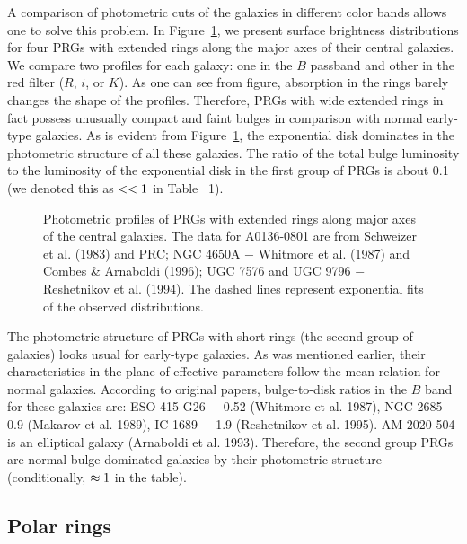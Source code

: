 A comparison of photometric cuts of the galaxies in different
color bands allows one to solve this problem. In Figure~\ref{Fcuts}, 
we present
surface brightness distributions for four PRGs with extended
rings along the major axes of their central galaxies. We compare
two profiles for each galaxy: one in the $B$
passband and other in the red filter ($R$, $i$, or $K$).
As one can see from figure, absorption in the rings barely
changes the shape of the profiles. Therefore, PRGs with wide
extended rings in fact possess unusually compact and faint bulges
in comparison with normal early-type galaxies. As is evident 
from Figure~\ref{Fcuts}, 
the exponential disk dominates in the photometric structure of all these 
galaxies. The ratio of the total bulge luminosity to the luminosity
of the exponential disk in the first group of PRGs is about 0.1 (we
denoted this as $\rm <<1$ in Table~ 1).

\begin{figure}
\picplace{0.8cm}
\caption[1]{Photometric profiles of PRGs with extended rings
along major axes of the central galaxies.
The data for A0136-0801 are from Schweizer et al. (1983) and PRC;
NGC 4650A $-$ Whitmore et al. (1987) and Combes \& Arnaboldi (1996);
UGC 7576 and UGC 9796 $-$ Reshetnikov et al. (1994). The dashed
lines represent exponential fits of the observed distributions.} 
\label{Fcuts}
\end{figure}  

The photometric structure of PRGs with short rings (the second
group of galaxies) looks usual for early-type galaxies. As
was mentioned earlier, their characteristics in the
plane of effective parameters follow the mean relation for
normal galaxies. According to original papers, 
bulge-to-disk ratios in the $B$ band for these galaxies are:
ESO 415-G26 $-$ 0.52 (Whitmore et al. 1987), NGC 2685 $-$ 0.9
(Makarov et al. 1989), IC 1689 $-$ 1.9 (Reshetnikov et al. 1995).
AM 2020-504 is an elliptical galaxy (Arnaboldi et al. 1993).
Therefore, the second group PRGs are normal bulge-dominated galaxies
by their photometric structure (conditionally, $\rm \approx 1$ in
the table).

\subsection{Polar rings}


